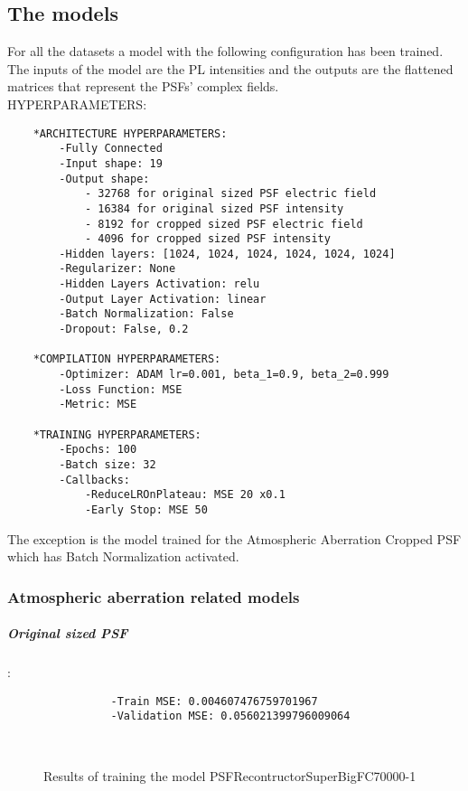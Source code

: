 \subsection{The models}

	For all the datasets a model with the following configuration has been trained. The inputs of the model are the PL intensities and the outputs are the flattened matrices that represent the PSFs' complex fields.\\
	
	{\normalsize HYPERPARAMETERS:}
	\begin{lstlisting}
	*ARCHITECTURE HYPERPARAMETERS:
		-Fully Connected
		-Input shape: 19
		-Output shape: 
			- 32768 for original sized PSF electric field
			- 16384 for original sized PSF intensity 
			- 8192 for cropped sized PSF electric field
			- 4096 for cropped sized PSF intensity 
		-Hidden layers: [1024, 1024, 1024, 1024, 1024, 1024]
		-Regularizer: None
		-Hidden Layers Activation: relu
		-Output Layer Activation: linear
		-Batch Normalization: False
		-Dropout: False, 0.2
	
	*COMPILATION HYPERPARAMETERS:
		-Optimizer: ADAM lr=0.001, beta_1=0.9, beta_2=0.999
		-Loss Function: MSE
		-Metric: MSE
	
	*TRAINING HYPERPARAMETERS:
		-Epochs: 100
		-Batch size: 32
		-Callbacks: 
			-ReduceLROnPlateau: MSE 20 x0.1
			-Early Stop: MSE 50
	\end{lstlisting}
	
	The exception is the model trained for the Atmospheric Aberration Cropped PSF which has Batch Normalization activated.
	
	\subsubsection{Atmospheric aberration related models}
	
		\subparagraph{Original sized PSF}:\\
		\begin{lstlisting}	
        		-Train MSE: 0.004607476759701967
        		-Validation MSE: 0.056021399796009064
		\end{lstlisting}
		
		\begin{figure*}[ht!]
			\hspace{\fill}
			\hspace{\fill}
			\\
			\caption{Results of training the model PSFRecontructorSuperBigFC70000-1}
		\end{figure*}
		
